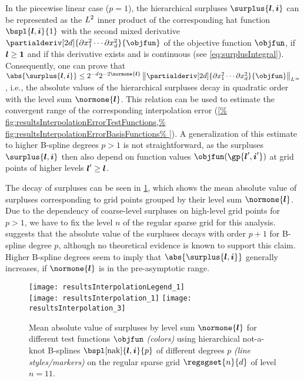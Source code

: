 In the piecewise linear case ($p = 1$),
the hierarchical surpluses $\surplus{\*l,\*i}$
can be represented as the $L^2$ inner product of
the corresponding hat function $\bspl{\*l,\*i}{1}$ with the
second mixed derivative
$\partialderiv[2d]{\partialdiff x_1^2 \dotsm \partialdiff x_d^2}{\objfun}$
of the objective function $\objfun$,
if ${\boldsymbol{l}} \ge {\boldsymbol{1}}$ and if this derivative exists and is continuous
(see \cref{eq:surplusIntegral}).
Consequently, one can prove that
$\abs{\surplus{\*l,\*i}} \le 2^{-d} 2^{-2\normone{\*l}}
\normLinftyscaled{
  \partialderiv[2d]{\partialdiff x_1^2 \dotsm \partialdiff x_d^2}{\objfun}
}$ \cite{Bungartz04Sparse},
i.e., the absolute values of the hierarchical surpluses
decay  in quadratic order with the level sum $\normone{\*l}$.
This relation can be used to estimate the convergent range
of the corresponding interpolation error (\cref{%
  fig:resultsInterpolationErrorTestFunctions,%
  fig:resultsInterpolationErrorBasisFunctions%
}).
A generalization of this estimate to higher B-spline degrees $p > 1$
is not straightforward, as the surpluses $\surplus{\*l,\*i}$
then also depend on function values $\objfun(\gp{\*l',\*i'})$ at
grid points of higher levels ${\boldsymbol{l}}' \ge {\boldsymbol{l}}$.

The decay of surpluses can be seen in \cref{fig:resultsDecaySurpluses},
which shows the mean absolute value of surpluses corresponding to
grid points grouped by their level sum $\normone{\*l}$.
Due to the dependency of coarse-level surpluses on high-level grid points
for $p > 1$,
we have to fix the level $n$ of the regular sparse grid for this analysis.
 suggests that the
absolute value of the surpluses decays with order $p + 1$ for
B-spline degree $p$, although no theoretical evidence
is known to support this claim.
Higher B-spline degrees seem to imply that
$\abs{\surplus{\*l,\*i}}$ generally increases, if $\normone{\*l}$ is
in the pre-asymptotic range.

\begin{figure}
  \texttt{[image: resultsInterpolationLegend\_1]}\\[2mm]%
  \texttt{[image: resultsInterpolation\_1]}%
  \hfill%
  \texttt{[image: resultsInterpolation\_3]}%
  \caption[Decay of surpluses for different test functions]{%
    Mean absolute value of surpluses by level sum $\normone{\*l}$
    \vspace{-0.05em}%
    for different test functions $\objfun$ \emph{(colors)}
    using hierarchical not-a-knot B-splines
    $\bspl[\nak]{\*l,\*i}{p}$ of different degrees $p$
    \emph{(line styles/markers)} on
    the regular sparse grid $\regsgset{n}{d}$ of level $n = 11$.%
  }%
  \label{fig:resultsDecaySurpluses}%
\end{figure}



